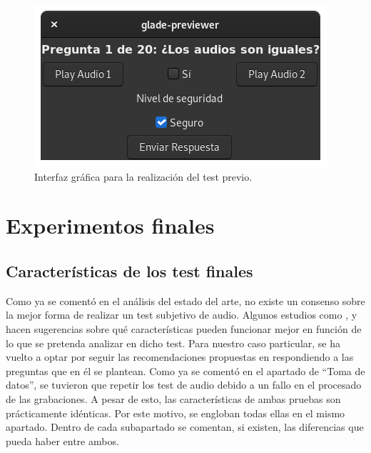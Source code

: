 \documentclass[11pt,a4paper,twoside]{book}
\begin{document}
                 \begin{figure}
                    \includegraphics[scale=0.6]{../imagenes/uiIni.png}
			        \centering
			        \caption{Interfaz gráfica para la realización del test previo.}
			        \label{fig:interfazInicial}
                \end{figure}
                
        \section{Experimentos finales}        
            
            \subsection{Características de los test finales}
                Como ya se comentó en el análisis del estado del arte, no existe un consenso sobre la mejor forma de realizar un test subjetivo de audio. Algunos estudios como \cite{Tejada2020}, \cite{delaPrida2019} y \cite{delaPrida2021} hacen sugerencias sobre qué características pueden funcionar mejor en función de lo que se pretenda analizar en dicho test. Para nuestro caso particular, se ha vuelto a optar por seguir las recomendaciones propuestas en \cite{Tejada2020} respondiendo a las preguntas que en él se plantean. Como ya se comentó en el apartado de ``Toma de datos'', se tuvieron que repetir los test de audio debido a un fallo en el procesado de las grabaciones. A pesar de esto, las características de ambas pruebas son prácticamente idénticas. Por este motivo, se engloban todas ellas en el mismo apartado. Dentro de cada subapartado se comentan, si existen, las diferencias que pueda haber entre ambos.
            
\end{document}
